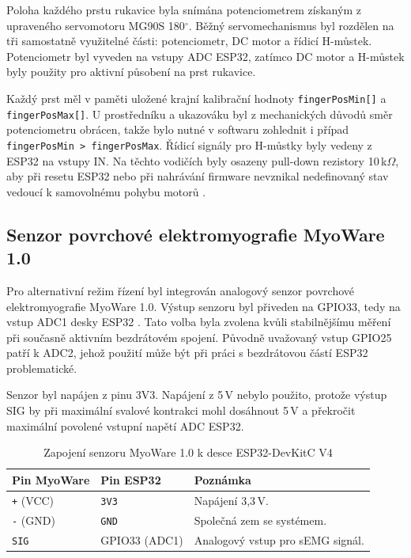 Poloha každého prstu rukavice byla snímána potenciometrem získaným z upraveného servomotoru MG90S 180$^\circ$. Běžný servomechanismus byl rozdělen na tři samostatně využitelné části: potenciometr, DC motor a řídicí H-můstek. Potenciometr byl vyveden na vstupy ADC ESP32, zatímco DC motor a H-můstek byly použity pro aktivní působení na prst rukavice.

Každý prst měl v paměti uložené krajní kalibrační hodnoty \texttt{fingerPosMin[]} a \texttt{fingerPosMax[]}. U prostředníku a ukazováku byl z mechanických důvodů směr potenciometru obrácen, takže bylo nutné v softwaru zohlednit i případ \texttt{fingerPosMin > fingerPosMax}. Řídicí signály pro H-můstky byly vedeny z ESP32 na vstupy IN\@. Na těchto vodičích byly osazeny pull-down rezistory 10\,k$\Omega$, aby při resetu ESP32 nebo při nahrávání firmware nevznikal nedefinovaný stav vedoucí k samovolnému pohybu motorů \cite{Safran2022}.

\subsection{Senzor povrchové elektromyografie MyoWare 1.0}
\label{subsec:myoware}

Pro alternativní režim řízení byl integrován analogový senzor povrchové elektromyografie MyoWare 1.0. Výstup senzoru byl přiveden na GPIO33, tedy na vstup ADC1 desky ESP32 \cite{espressif_adc}. Tato volba byla zvolena kvůli stabilnějšímu měření při současně aktivním bezdrátovém spojení. Původně uvažovaný vstup GPIO25 patří k ADC2, jehož použití může být při práci s bezdrátovou částí ESP32 problematické.

Senzor byl napájen z pinu 3V3. Napájení z 5\,V nebylo použito, protože výstup SIG by při maximální svalové kontrakci mohl dosáhnout 5\,V a překročit maximální povolené vstupní napětí ADC ESP32.

\begin{table}[htbp]
\centering
\caption{Zapojení senzoru MyoWare 1.0 k desce ESP32-DevKitC V4}
\label{tab:myoware}
\begin{tabular}{|p{}|p{}|p{}|}
\hline
\textbf{Pin MyoWare} & \textbf{Pin ESP32} & \textbf{Poznámka} \\
\hline
\texttt{+} (VCC) & \texttt{3V3} & Napájení 3,3\,V. \\
\hline
\texttt{-} (GND) & \texttt{GND} & Společná zem se systémem. \\
\hline
\texttt{SIG} & GPIO33 (ADC1) & Analogový vstup pro sEMG signál. \\
\hline
\end{tabular}
\end{table}

